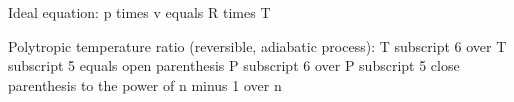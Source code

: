 Ideal equation:
p times v equals R times T

Polytropic temperature ratio (reversible, adiabatic process):
T subscript 6 over T subscript 5 equals open parenthesis P subscript 6 over P subscript 5 close parenthesis to the power of n minus 1 over n